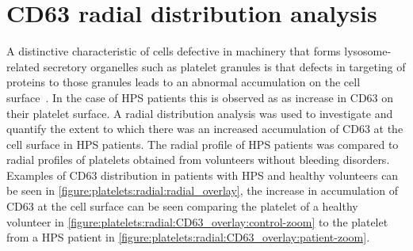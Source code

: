 \section{CD63 radial distribution analysis}
\label{platelets:image_processing:radial}
A distinctive characteristic of cells defective in machinery that forms lysosome-related secretory organelles such as platelet granules is that defects in targeting of proteins to those granules leads to an abnormal accumulation on the cell surface~\cite{DellAngelica1999}. In the case of HPS patients this is observed as as increase in CD63 on their platelet surface. A radial distribution analysis was used to investigate and quantify the extent to which there was an increased accumulation of CD63 at the cell surface in HPS patients. The radial profile of HPS patients was compared to radial profiles of platelets obtained from volunteers without bleeding disorders. Examples of CD63 distribution in patients with HPS and healthy volunteers can be seen in \autoref{figure:platelets:radial:radial_overlay}, the increase in accumulation of CD63 at the cell surface can be seen comparing the platelet of a healthy volunteer in \autoref{figure:platelets:radial:CD63_overlay:control-zoom} to the platelet from a HPS patient in \autoref{figure:platelets:radial:CD63_overlay:patient-zoom}.

